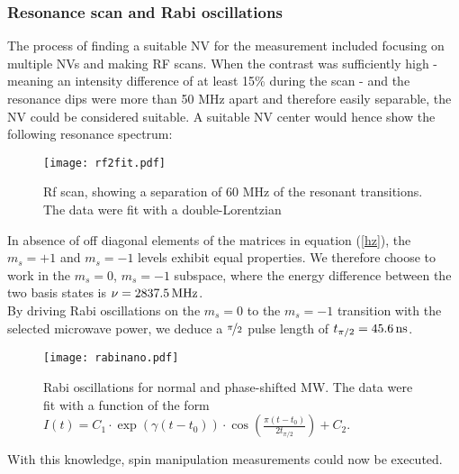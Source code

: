 \documentclass[12pt,a4paper]{article}
\begin{document}
\subsubsection{Resonance scan and Rabi oscillations}
The process of finding a suitable NV for the measurement included focusing on multiple NVs and making RF scans. When the contrast was sufficiently high - meaning an intensity difference of at least 15\% during the scan - and the resonance dips were more than 50 MHz apart and therefore easily separable, the NV could be considered suitable. A suitable NV center would hence show the following resonance spectrum:
\begin{figure}[H]
\texttt{[image: rf2fit.pdf]} 
\caption{Rf scan, showing a separation of 60 MHz of the resonant transitions. The data were fit with a double-Lorentzian}
\label{rf2}
\end{figure}
In absence of off diagonal elements of the matrices in equation (\ref{hz}), the $m_s=+1$ and $m_s=-1$ levels exhibit equal properties. We therefore choose to work in the $m_s=0$, $m_s=-1$ subspace, where the energy difference between the two basis states is $\nu=\unit[2837.5]{MHz}$.
\\
By driving Rabi oscillations on the $m_s=0$ to the $m_s=-1$ transition with the selected microwave power, we deduce a $\nicefrac{\pi}{2}$ pulse length of $t_{\pi/2}=\unit[45.6]{ns}$. \\
\begin{figure}[H]
\texttt{[image: rabinano.pdf]} 
\caption{Rabi oscillations for normal and phase-shifted MW. The data were fit with a function of the form $I(t)=C_1\cdot\exp(\gamma(t-t_0))\cdot\cos\left(\frac{\pi(t-t_0)}{2t_{\pi/2}}\right)+C_2$.}
\label{rabn1}
\end{figure}
With this knowledge, spin manipulation measurements could now be executed. 
\end{document}
